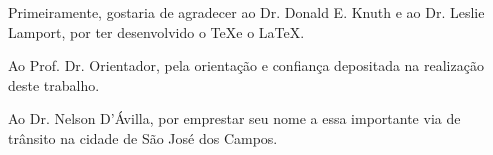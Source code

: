 Primeiramente, gostaria de agradecer ao Dr. Donald E. Knuth e ao Dr. Leslie Lamport, por ter desenvolvido o \TeX e o \LaTeX.

Ao Prof. Dr. Orientador, pela orientação e confiança depositada na realização deste trabalho.

Ao Dr. Nelson D'Ávilla, por emprestar seu nome a essa importante via de trânsito na cidade de São José dos Campos.
